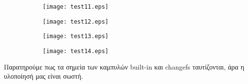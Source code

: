 \begin{figure}
    \centering
\begin{subfigure}[h]{0.49\textwidth}
  \centering
  \texttt{[image: test11.eps]}
\end{subfigure}
\begin{subfigure}[h]{0.49\textwidth}\centering
  \centering
  \texttt{[image: test12.eps]}
  \end{subfigure}
\begin{subfigure}[h]{0.49\textwidth}
  \centering
  \texttt{[image: test13.eps]}
\end{subfigure}
\begin{subfigure}[h]{0.49\textwidth}\centering
  \centering
  \texttt{[image: test14.eps]}
  \end{subfigure}
\end{figure}

\par Παρατηρούμε πως τα σημεία των καμπυλών built-in και changefs ταυτίζονται, 
άρα η υλοποίησή μας είναι σωστή.
